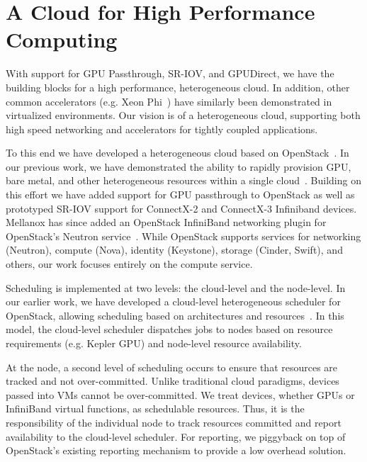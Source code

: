 \section{A Cloud for High Performance Computing}
With support for GPU Passthrough, SR-IOV, and GPUDirect, we have the building
blocks for a high performance, heterogeneous cloud.  In addition, other common
accelerators (e.g. Xeon Phi~\cite{Phi}) have similarly been demonstrated in
virtualized environments.  Our vision is of a heterogeneous cloud, supporting
both high speed networking and accelerators for tightly coupled applications.

To this end we have developed a heterogeneous cloud based on
OpenStack~\cite{www-openstack}.  In our previous work, we
have demonstrated the ability to rapidly provision GPU, bare metal, and other
heterogeneous resources within a single cloud~\cite{crago2011heterogeneous}.
Building on this effort we have added support for GPU passthrough to OpenStack
as well as prototyped SR-IOV support for ConnectX-2 and ConnectX-3 Infiniband devices.
Mellanox  has since added an OpenStack InfiniBand networking plugin for
OpenStack's Neutron service~\cite{ML2}. %
While OpenStack supports services for networking (Neutron), compute (Nova), identity
(Keystone), storage (Cinder, Swift), and others, our work focuses entirely
on the compute service.  

Scheduling is implemented at two levels: the cloud-level and the node-level.  In
our earlier work, we have developed a cloud-level heterogeneous scheduler for OpenStack,
allowing scheduling based on architectures and
resources~\cite{crago2011heterogeneous}.  In this model, the cloud-level
scheduler dispatches jobs to nodes based on resource requirements (e.g. Kepler
GPU) and node-level resource availability.

At the node, a second level of scheduling occurs to ensure that resources are
tracked and not over-committed.  Unlike traditional cloud paradigms, devices
passed into VMs cannot be over-committed.  We treat devices, whether GPUs or
InfiniBand virtual functions, as schedulable resources.  Thus, it is the responsibility of the
individual node to track resources committed and report availability to the
cloud-level scheduler.  For reporting, we piggyback on top of OpenStack's
existing reporting mechanism to provide a low overhead solution.


